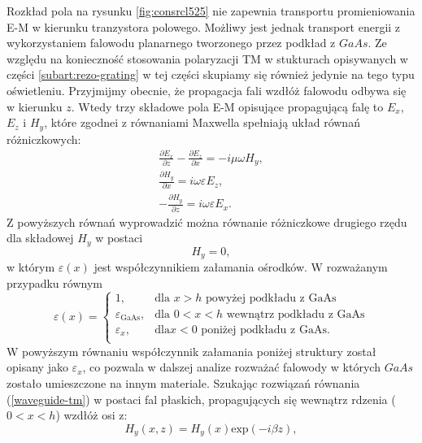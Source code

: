 Rozkład pola na rysunku \ref{fig:consrcl525} nie zapewnia transportu promieniowania E-M w kierunku tranzystora polowego. Możliwy jest jednak transport energii z wykorzystaniem falowodu planarnego tworzonego przez podkład z $GaAs$. Ze względu na konieczność stosowania polaryzacji TM w stukturach opisywanych w części \ref{subart:rezo-grating} w tej części skupiamy się również jedynie na tego typu oświetleniu. Przyjmijmy obecnie, że propagacja fali wzdłóż falowodu odbywa się w kierunku $z$. Wtedy trzy składowe pola E-M opisujące propagującą falę to $E_x$,$E_z$ i $H_y$, które zgodnei z równaniami Maxwella spełniają układ równań różniczkowych:
\begin{equation}
\begin{gathered}
	\frac{\partial E_x}{\partial z} - \frac{\partial E_z}{\partial x} = -i \mu \omega H_y,\\	
	\frac{\partial H_y}{\partial x} = i \omega \varepsilon E_z, \\
	- \frac{\partial H_y}{\partial z} = i \omega \varepsilon E_x.
\end{gathered}
\end{equation}
Z powyższych równań wyprowadzić można równanie różniczkowe drugiego rzędu dla składowej $H_y$ w postaci
\begin{equation}
	[ \frac{\partial^2}{\partial x^2} + \frac{\partial^2}{\partial z^2} + \omega^2 \mu_0 \varepsilon (x) ] H_y = 0,
	\label{eq:waveguide-tm}
\end{equation}
w którym $\varepsilon(x)$ jest współczynnikiem załamania ośrodków. W rozważanym przypadku równym
\begin{equation}
\varepsilon(x)=  
\begin{cases} 
	1, & \mbox{dla } x>h\mbox{ powyżej podkładu z GaAs } \\ 
	\varepsilon_{\textrm{GaAs}}, & \mbox{dla } 0<x<h\mbox{ wewnątrz podkładu z GaAs} \\
	\varepsilon_x,	&	\mbox{dla} x<0\mbox{ poniżej podkładu z GaAs}.\\
\end{cases}
\end{equation}
W powyższym równaniu współczynnik załamania poniżej struktury został opisany jako $\varepsilon_x$, co pozwala w dalszej analize rozważać falowody w których $GaAs$ zostało umieszczone na innym materiale. Szukając rozwiązań równania (\ref{waveguide-tm}) w postaci fal płaskich, propagujących się wewnątrz rdzenia ($0<x<h$) wzdłóż osi z:
\begin{equation}
	H_y(x,z)=H_y(x) \textrm{exp}(-i \beta z),
\end{equation}
